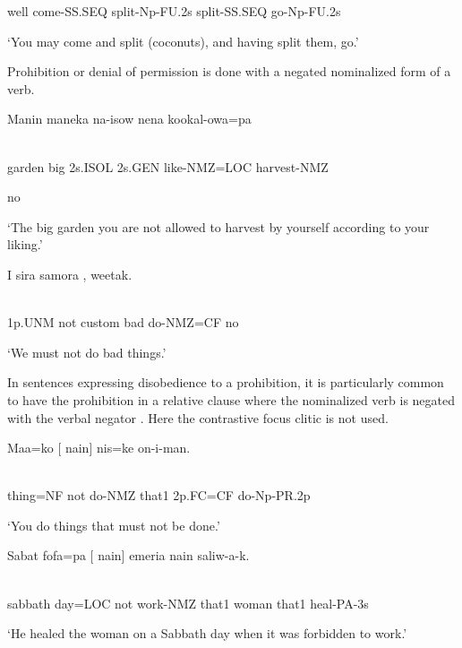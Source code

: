 well  come-SS.SEQ  split-Np-FU.2s  split-SS.SEQ  go-Np-FU.2s

`You may come and split (coconuts), and having split them, go.'

Prohibition or denial of permission is done with a negated nominalized form of a verb.

\ea%
\label{ex:x1087}
\gll Manin  maneka  na-isow  nena  kookal-owa=pa   \\
      \\
\glt
\z

garden  big  2s.ISOL  2s.GEN  like-NMZ=LOC  harvest-NMZ


no

`The big garden you are not allowed to harvest by yourself according to your liking.'

\ea%
\label{ex:x1078}
\gll I    sira  samora  ,  weetak. \\
      \\
\glt
\z

1p.UNM  not  custom  bad  do-NMZ=CF  no

`We must not do bad things.'

In sentences expressing disobedience to a prohibition, it is particularly common to have the prohibition in a relative clause where the nominalized verb is negated with the verbal negator . Here the contrastive focus clitic is not used. 

\ea%
\label{ex:x1887}
\gll Maa=ko  [  nain]  nis=ke  on-i-man. \\
      \\
\glt
\z

thing=NF  not  do-NMZ  that1  2p.FC=CF  do-Np-PR.2p

`You do things that must not be done.'

\ea%
\label{ex:x1888}
\gll Sabat  fofa=pa  [  nain]  emeria  nain  saliw-a-k. \\
      \\
\glt
\z

sabbath  day=LOC  not  work-NMZ  that1  woman  that1  heal-PA-3s

`He healed the woman on a Sabbath day when it was forbidden to work.'

